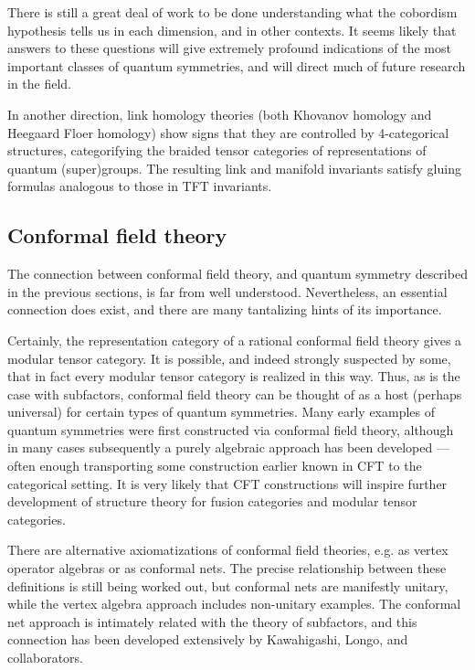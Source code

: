 \documentclass[12pt]{article}
\begin{document}
There is still a great deal of work to be done understanding what the cobordism hypothesis tells us in each dimension, and in other contexts. It seems likely that answers to these questions will give extremely profound indications of the most important classes of quantum symmetries, and will direct much of future research in the field.

In another direction, link homology theories (both Khovanov homology and Heegaard Floer homology) show signs that they are controlled by 4-categorical structures, categorifying the braided tensor categories of representations of quantum (super)groups. The resulting link and manifold invariants satisfy gluing formulas analogous to those in TFT invariants. 

\subsection{Conformal field theory}
The connection between conformal field theory, and quantum symmetry described in the previous sections, is far from well understood. Nevertheless, an essential connection does exist, and there are many tantalizing hints of its importance.

Certainly, the representation category of a rational conformal field theory gives a modular tensor category. It is possible, and indeed strongly suspected by some, that in fact every modular tensor category is realized in this way. Thus, as is the case with subfactors, conformal field theory can be thought of as a host (perhaps universal) for certain types of quantum symmetries. Many early examples of quantum symmetries were first constructed via conformal field theory, although in many cases subsequently a purely algebraic approach has been developed --- often enough transporting some construction earlier known in CFT to the categorical setting. It is very likely that CFT constructions will inspire further development of structure theory for fusion categories and modular tensor categories.

There are alternative axiomatizations of conformal field theories, e.g.  as vertex operator algebras or as conformal nets. The precise relationship between these definitions is still being worked out, but conformal nets are manifestly unitary, while the vertex algebra approach includes non-unitary examples. The conformal net approach is intimately related with the theory of subfactors, and this connection has been developed extensively by Kawahigashi, Longo, and collaborators.
\end{document}
